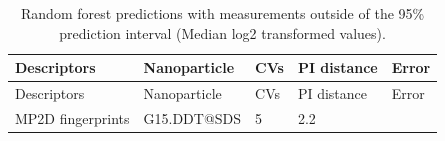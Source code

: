 \documentclass[utf8]{frontiersHLTH} %
\begin{document}
\begin{longtable}[]{@{}lllll@{}}
\caption{Random forest predictions with measurements outside of the 95\%
prediction interval (Median log2 transformed values). }\tabularnewline
\toprule
\begin{minipage}[b]{0.26\columnwidth}\raggedright\strut
Descriptors\strut
\end{minipage} & \begin{minipage}[b]{0.21\columnwidth}\raggedright\strut
Nanoparticle\strut
\end{minipage} & \begin{minipage}[b]{0.06\columnwidth}\raggedright\strut
CVs\strut
\end{minipage} & \begin{minipage}[b]{0.15\columnwidth}\raggedright\strut
PI distance\strut
\end{minipage} & \begin{minipage}[b]{0.08\columnwidth}\raggedright\strut
Error\strut
\end{minipage}\tabularnewline
\midrule
\endfirsthead
\toprule
\begin{minipage}[b]{0.26\columnwidth}\raggedright\strut
Descriptors\strut
\end{minipage} & \begin{minipage}[b]{0.21\columnwidth}\raggedright\strut
Nanoparticle\strut
\end{minipage} & \begin{minipage}[b]{0.06\columnwidth}\raggedright\strut
CVs\strut
\end{minipage} & \begin{minipage}[b]{0.15\columnwidth}\raggedright\strut
PI distance\strut
\end{minipage} & \begin{minipage}[b]{0.08\columnwidth}\raggedright\strut
Error\strut
\end{minipage}\tabularnewline
\midrule
\endhead
\begin{minipage}[t]{0.26\columnwidth}\raggedright\strut
MP2D fingerprints\strut
\end{minipage} & \begin{minipage}[t]{0.21\columnwidth}\raggedright\strut
G15.DDT@SDS\strut
\end{minipage} & \begin{minipage}[t]{0.06\columnwidth}\raggedright\strut
5\strut
\end{minipage} & \begin{minipage}[t]{0.15\columnwidth}\raggedright\strut
2.2\strut

\end{minipage}
\end{longtable}
\end{document}
